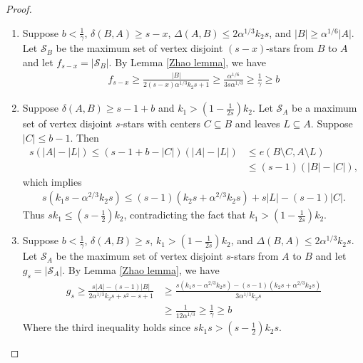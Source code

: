 \documentclass[oneside,12pt]{memoir}
\begin{document}
\begin{proof}

\begin{enumerate}

\item Suppose $b<\frac{1}{\gamma}$, $\delta(B,A)\geq s-x$, $\Delta(A,B)\leq 2\alpha^{1/3}k_2s$, and $|B|\geq \alpha^{1/6}|A|$.  Let $\mathcal{S}_B$ be the maximum set of vertex disjoint $(s-x)$-stars from $B$ to $A$ and let $f_{s-x}=|\mathcal{S}_B|$.  By Lemma \ref{Zhao lemma}, we have
\begin{align*}
f_{s-x}\geq \frac{|B|}{2(s-x)\alpha^{1/3}k_2s+1}\geq \frac{\alpha^{1/6}}{3s\alpha^{1/3}}
\geq \frac{1}{\gamma}
\geq b
\end{align*}

\item Suppose $\delta(A,B)\geq s-1+b$ and $k_1>(1-\frac{1}{2s})k_2$.  Let $\mathcal{S}_A$ be a maximum set of vertex disjoint $s$-stars with centers $C\subseteq B$ and leaves $L\subseteq A$.  Suppose $|C|\leq b-1$.  Then 
\begin{align*}
s(|A|-|L|) \leq(s-1+b-|C|)(|A|-|L|) &\leq e(B\setminus C, A\setminus L)\\
&\leq (s-1)(|B|-|C|),
\end{align*}
which implies
\begin{align*}
s(k_1s-\alpha^{2/3}k_2s)\leq (s-1)(k_2s+\alpha^{2/3}k_2s)+s|L|-(s-1)|C|.
\end{align*}
Thus $sk_1\leq (s-\frac{1}{2})k_2$, contradicting the fact that $k_1>(1-\frac{1}{2s})k_2$.

\item Suppose $b<\frac{1}{\gamma}$, $\delta(A,B)\geq s$, $k_1>(1-\frac{1}{2s})k_2$, and $\Delta(B,A)\leq 2\alpha^{1/3}k_2s$.  Let $\mathcal{S}_A$ be the maximum set of vertex disjoint $s$-stars from $A$ to $B$ and let $g_s=|\mathcal{S}_A|$.  By Lemma \ref{Zhao lemma}, we have
\begin{align*}
g_s\geq \frac{s|A|-(s-1)|B|}{2\alpha^{1/3}k_2s+s^2-s+1}&\geq \frac{s(k_1s-\alpha^{2/3}k_2s)-(s-1)(k_2s+\alpha^{2/3}k_2s)}{3\alpha^{1/3}k_2s}
\\
&\geq \frac{1}{12\alpha^{1/3}}\geq \frac{1}{\gamma}\geq b
\end{align*}
Where the third inequality holds since $sk_1s> (s-\frac{1}{2})k_2s$.


\end{enumerate}
\end{proof}
\end{document}
